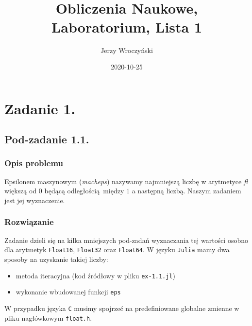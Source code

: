 \documentclass[10pt]{article}
\title{Obliczenia Naukowe,\\Laboratorium, Lista 1}
\author{Jerzy Wroczyński}
\date{2020-10-25}
\begin{document}
\maketitle

\section{Zadanie 1.}

\subsection{Pod-zadanie 1.1.}

\subsubsection{Opis problemu}
Epsilonem maszynowym (\textit{macheps}) nazywamy najmniejszą liczbę w arytmetyce \textit{fl} większą od $0$ będącą odległością między $1$ a następną liczbą. Naszym zadaniem jest jej wyznaczenie.

\subsubsection{Rozwiązanie}
Zadanie dzieli się na kilka mniejszych pod-zadań wyznaczania tej wartości osobno dla arytmetyk \texttt{Float16}, \texttt{Float32} oraz \texttt{Float64}.
W języku \texttt{Julia} mamy dwa sposoby na uzyskanie takiej liczby:
\begin{itemize}
    \item metoda iteracyjna (kod źródłowy w pliku \texttt{ex-1.1.jl})
    \item wykonanie wbudowanej funkcji \texttt{eps}
\end{itemize}
W przypadku języka \texttt{C} musimy spojrzeć na predefiniowane globalne zmienne w pliku nagłówkowym \texttt{float.h}.
\end{document}
